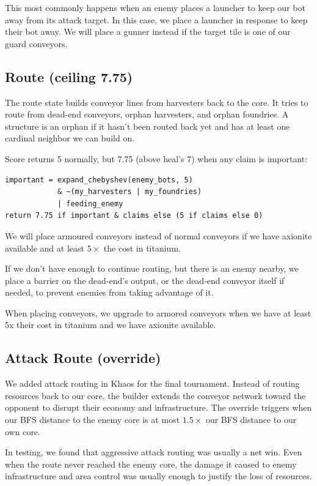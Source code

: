 \documentclass[10pt,sigconf,nonacm]{acmart}
\begin{document}
This most commonly happens when an enemy places a launcher to keep our bot away from its attack target. In this case, we place a launcher in response to keep their bot away. We will place a gunner instead if the target tile is one of our guard conveyors.

\subsection{Route (ceiling 7.75)}

The route state builds conveyor lines from harvesters back to the core. It tries to route from dead-end conveyors, orphan harvesters, and orphan foundries. A structure is an orphan if it hasn't been routed back yet and has at least one cardinal neighbor we can build on.

Score returns 5 normally, but 7.75 (above heal's 7) when any claim is important:

\begin{lstlisting}
important = expand_chebyshev(enemy_bots, 5)
            & ~(my_harvesters | my_foundries)
            | feeding_enemy
return 7.75 if important & claims else (5 if claims else 0)
\end{lstlisting}

We will place armoured conveyors instead of normal conveyors if we have axionite available and at least $5\times$ the cost in titanium.

If we don't have enough to continue routing, but there is an enemy nearby, we place a barrier on the dead-end's output, or the dead-end conveyor itself if needed, to prevent enemies from taking advantage of it.

When placing conveyors, we upgrade to armored conveyors when we have at least 5x their cost in titanium and we have axionite available.

\subsection{Attack Route (override)}

We added attack routing in Khaos for the final tournament. Instead of routing resources back to our core, the builder extends the conveyor network toward the opponent to disrupt their economy and infrastructure. The override triggers when our BFS distance to the enemy core is at most $1.5\times$ our BFS distance to our own core.

In testing, we found that aggressive attack routing was usually a net win. Even when the route never reached the enemy core, the damage it caused to enemy infrastructure and area control was usually enough to justify the loss of resources.
\end{document}
